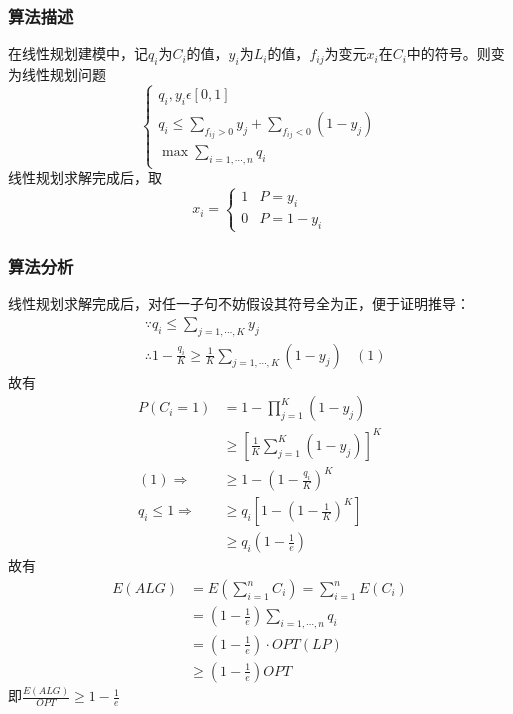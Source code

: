 \subsubsection{算法描述}

在线性规划建模中，记$q_i$为$C_i$的值，$y_i$为$L_i$的值，$f_{ij}$为变元$x_i$在$C_i$中的符号。则变为线性规划问题
\[
	\begin{cases}
		q_i,y_i\epsilon [0,1]\\
		q_i\leqslant \sum\limits _{f_{ij}>0}y_j+\sum\limits _{f_{ij}<0}(1-y_j)\\
		\max \sum\limits_{i=1,\cdots,n}q_i
	\end{cases}
\]
线性规划求解完成后，取
\[
	x_i=\begin{cases}
		1 &P=y_i\\
		0 &P=1-y_i
	\end{cases}
\]

\subsubsection{算法分析}
线性规划求解完成后，对任一子句不妨假设其符号全为正，便于证明推导：
\begin{displaymath}
	\begin{split}
		&\because q_i\leqslant \sum\limits_{j=1,\cdots,K} y_j\\
		&\therefore 1-\frac{q_i}{K}\geqslant \frac{1}{K}\sum\limits_{j=1,\cdots,K}(1-y_j)\ \ \ \ (1)
	\end{split}
\end{displaymath}
故有
\begin{displaymath}
	\begin{split}
		P(C_i=1)&=1-\prod _{j=1}^K(1-y_j)\\
		&\geqslant[\frac{1}{K}\sum\limits_{j=1}^K(1-y_j)]^K\\
		(1)\Rightarrow &\geqslant 1-(1-\frac{q_i}{K})^K\\
		q_i\leqslant 1\Rightarrow &\geqslant q_i[1-(1-\frac{1}{K})^K]\\
		&\geqslant q_i(1-\frac{1}{e})
	\end{split}
\end{displaymath}
故有
\begin{displaymath}
	\begin{split}
		E(ALG)&=E(\sum\limits_{i=1}^n C_i)=\sum\limits_{i=1}^n E(C_i)\\
		&=(1-\frac{1}{e})\sum\limits_{i=1,\cdots,n}q_i\\
		&=(1-\frac{1}{e})\cdot OPT(LP)\\
		&\geqslant(1-\frac{1}{e})OPT
	\end{split}
\end{displaymath}
即$\frac{E(ALG)}{OPT}\geqslant 1-\frac{1}{e}$
